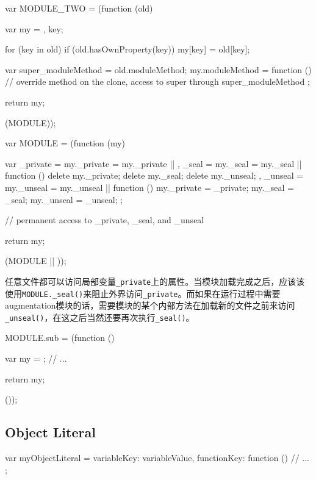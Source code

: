 \begin{JavaScript}[复制和继承]
var MODULE_TWO = (function (old) {
	var my = {},
		key;

	for (key in old) {
		if (old.hasOwnProperty(key)) {
			my[key] = old[key];
		}
	}

	var super_moduleMethod = old.moduleMethod;
	my.moduleMethod = function () {
		// override method on the clone, access to super through super_moduleMethod
	};

	return my;
}(MODULE));
\end{JavaScript}


\begin{JavaScript}[跨文件的私有状态]
var MODULE = (function (my) {
	var _private = my._private = my._private || {},
		_seal = my._seal = my._seal || function () {
			delete my._private;
			delete my._seal;
			delete my._unseal;
		},
		_unseal = my._unseal = my._unseal || function () {
			my._private = _private;
			my._seal = _seal;
			my._unseal = _unseal;
		};

	// permanent access to _private, _seal, and _unseal

	return my;
}(MODULE || {}));
\end{JavaScript}


任意文件都可以访问局部变量\lstinline$_private$上的属性。当模块加载完成之后，应该该使用\lstinline$MODULE._seal()$来阻止外界访问\lstinline$_private$。而如果在运行过程中需要augmentation模块的话，需要模块的某个内部方法在加载新的文件之前来访问\lstinline$_unseal()$，在这之后当然还要再次执行\lstinline$_seal()$。

\begin{JavaScript}[子模块]
MODULE.sub = (function () {
	var my = {};
	// ...

	return my;
}());
\end{JavaScript}




\subsection{Object Literal}


\begin{JavaScript}[\{注意使用在statement的开头会被解析成block]
var myObjectLiteral = {
    variableKey: variableValue,
    functionKey: function () {
        // ...
    }
};
\end{JavaScript}
